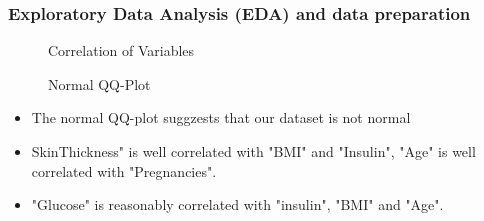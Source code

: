 \documentclass{beamer}
\begin{document}
\begin{frame}
    \frametitle{Exploratory Data Analysis (EDA) and data preparation}
    \begin{figure}[h!]
        \centering
        \begin{minipage}{0.45\textwidth}
            \caption{Correlation of Variables} 
            \label{fig:corplot}
        \end{minipage}
        \hfill %
        \centering
        \begin{minipage}{0.45\textwidth}
            \centering
            \caption{Normal QQ-Plot} 
            \label{fig:qqplot}
        \end{minipage}
    \end{figure}
    \begin{itemize}
        \item The normal QQ-plot suggzests that our dataset is not normal
        \item SkinThickness" is well correlated with "BMI" and "Insulin", "Age" is well correlated with "Pregnancies".
        \item "Glucose" is reasonably correlated with "insulin", "BMI" and "Age".
    \end{itemize}
    

\end{frame}
\end{document}
